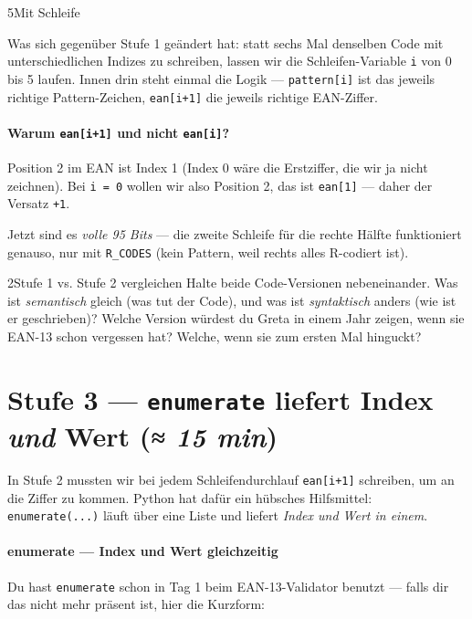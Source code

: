 \begin{pythoneinheit}{5}{Mit Schleife}

Was sich gegenüber Stufe 1 geändert hat: statt sechs Mal denselben
Code mit unterschiedlichen Indizes zu schreiben, lassen wir die
Schleifen-Variable \texttt{i} von 0 bis 5 laufen. Innen drin steht
einmal die Logik — \texttt{pattern[i]} ist das jeweils richtige
Pattern-Zeichen, \texttt{ean[i+1]} die jeweils richtige EAN-Ziffer.

\paragraph{Warum \texttt{ean[i+1]} und nicht \texttt{ean[i]}?}
Position 2 im EAN ist Index 1 (Index 0 wäre die Erstziffer, die wir
ja nicht zeichnen). Bei \texttt{i = 0} wollen wir also Position 2,
das ist \texttt{ean[1]} — daher der Versatz \texttt{+1}.

Jetzt sind es \emph{volle 95 Bits} — die zweite Schleife für die
rechte Hälfte funktioniert genauso, nur mit \texttt{R\_CODES} (kein
Pattern, weil rechts alles R-codiert ist).
\end{pythoneinheit}

\begin{bleistiftuebung}{2}{Stufe 1 vs. Stufe 2 vergleichen}
Halte beide Code-Versionen nebeneinander. Was ist \emph{semantisch}
gleich (was tut der Code), und was ist \emph{syntaktisch} anders (wie
ist er geschrieben)? Welche Version würdest du Greta in einem Jahr
zeigen, wenn sie EAN-13 schon vergessen hat? Welche, wenn sie zum
ersten Mal hinguckt?
\end{bleistiftuebung}

\section{Stufe 3 — \texttt{enumerate} liefert Index \emph{und} Wert \normalfont(\textit{≈ 15 min})}

In Stufe 2 mussten wir bei jedem Schleifendurchlauf \texttt{ean[i+1]}
schreiben, um an die Ziffer zu kommen. Python hat dafür ein hübsches
Hilfsmittel: \texttt{enumerate(...)} läuft über eine Liste und liefert
\emph{Index und Wert in einem}.

\paragraph{enumerate — Index und Wert gleichzeitig}
Du hast \texttt{enumerate} schon in Tag 1 beim EAN-13-Validator
benutzt — falls dir das nicht mehr präsent ist, hier die Kurzform:

